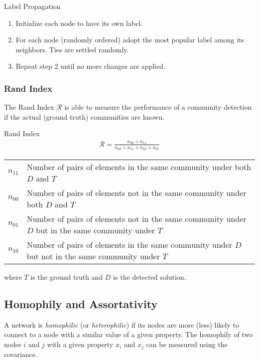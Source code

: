 \documentclass[english]{panikzettel}
\begin{document}
\begin{algo}{Label Propagation}
\begin{enumerate}
	\item Initialize each node to have its own label.
	\item For each node (randomly ordered) adopt the most popular label among its neighbors.
	Ties are settled randomly.
	\item Repeat step 2 until no more changes are applied.
\end{enumerate}
\end{algo}

\subsubsection{Rand Index}
The Rand Index $ \mathcal{R} $ is able to measure the performance of a community detection if the actual (ground truth) communities  are known.

\begin{defi}{Rand Index}
\begin{align*}
	\mathcal{R} = \frac{n_{00} + n_{11}}{n_{00} + n_{11} + n_{10} + n_{01}}
\end{align*}
\begin{tabular}{cp{14.5cm}}
$ n_{11} $ & Number of pairs of elements in the same community under both $ D $ and $ T $ \\
$ n_{00} $ & Number of pairs of elements not in the same community under both $ D $ and $ T $ \\
$ n_{01} $ & Number of pairs of elements not in the same community under $ D $ but in the same community under $ T $ \\
$ n_{10} $ & Number of pairs of elements in the same community under $ D $ but not in the same community under $ T $ \\
\end{tabular}

where $ T $ is the ground truth and $ D $ is the detected solution.
\end{defi}

\subsection{Homophily and Assortativity}
A network is \emph{homophilic} (or \emph{heterophilic}) if its nodes are more (less) likely to connect to a node with a similar value of a given property.
The homophily of two nodes $ i $ and $ j $ with a given property $ x_i $ and $ x_j $ can be measured using the covariance.
\end{document}
